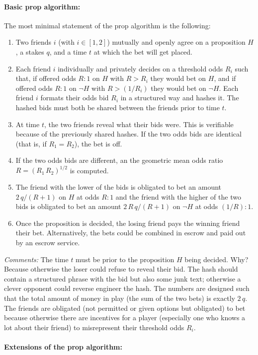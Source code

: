 \documentclass{article}
\renewcommand{\not}{\neg}
\begin{document}
\paragraph{Basic prop algorithm:}
The most minimal statement of the prop algorithm is the following:
\begin{enumerate}
    \item Two friends $i$ (with $i\in[1,2]$) mutually and openly agree on a proposition $H$, a stakes $q$, and a time $t$ at which the bet will get placed.
    \item Each friend $i$ individually and privately decides on a threshold odds $R_i$ such that, if offered odds $R:1$ on $H$ with $R>R_i$ they would bet on $H$, and if offered odds $R:1$ on $\not H$ with $R>(1/R_i)$ they would bet on $\not H$. Each friend $i$ formats their odds bid $R_i$ in a structured way and hashes it. The hashed bids must both be shared between the friends prior to time $t$.
    \item At time $t$, the two friends reveal what their bids were. This is verifiable because of the previously shared hashes. If the two odds bids are identical (that is, if $R_1=R_2$), the bet is off.
    \item If the two odds bids are different, an the geometric mean odds ratio $R=(R_1\,R_2)^{1/2}$ is computed.
    \item The friend with the lower of the bids is obligated to bet an amount $2\,q/(R+1)$ on $H$ at odds $R:1$ and the friend with the higher of the two bids is obligated to bet an amount $2\,R\,q/(R+1)$ on $\not H$ at odds $(1/R):1$.
    \item Once the proposition is decided, the losing friend pays the winning friend their bet. Alternatively, the bets could be combined in escrow and paid out by an escrow service.
\end{enumerate}
\emph{Comments:} The time $t$ must be prior to the proposition $H$ being decided.
Why? Because otherwise the loser could refuse to reveal their bid.
The hash should contain a structured phrase with the bid but also some junk text;
otherwise a clever opponent could reverse engineer the hash.
The numbers are designed such that the total amount of money in play (the sum of the two bets) is exactly $2\,q$.
The friends are obligated (not permitted or given options but obligated) to bet
because otherwise there are incentives for a player (especially one who knows a lot about their friend)
to misrepresent their threshold odds $R_i$.

\paragraph{Extensions of the prop algorithm:}
\end{document}
